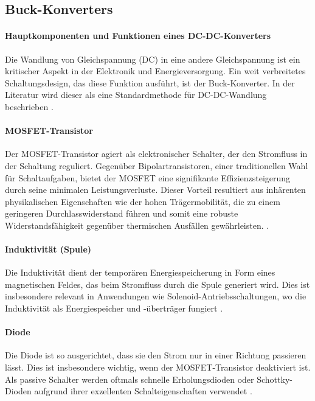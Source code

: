 \subsection{Buck-Konverters}
\label{sec:DCDC_Konverter}

\paragraph{Hauptkomponenten und Funktionen eines DC-DC-Konverters}

Die Wandlung von Gleichspannung (DC) in eine andere Gleichspannung ist ein kritischer Aspekt in der Elektronik und Energieversorgung. Ein weit verbreitetes Schaltungsdesign, das diese Funktion ausführt, ist der Buck-Konverter. In der Literatur wird dieser als eine Standardmethode für DC-DC-Wandlung beschrieben \cite{wensdesign2022}.



\paragraph{MOSFET-Transistor}
Der MOSFET-Transistor agiert als elektronischer Schalter, der den Stromfluss in der Schaltung reguliert. Gegenüber Bipolartransistoren, einer traditionellen Wahl für Schaltaufgaben, bietet der MOSFET eine signifikante Effizienzsteigerung durch seine minimalen Leistungsverluste. Dieser Vorteil resultiert aus inhärenten physikalischen Eigenschaften wie der hohen Trägermobilität, die zu einem geringeren Durchlasswiderstand führen und somit eine robuste Widerstandsfähigkeit gegenüber thermischen Ausfällen gewährleisten. \cite{choi2013pulsewidth}.

\paragraph{Induktivität (Spule)}
Die Induktivität dient der temporären Energiespeicherung in Form eines magnetischen Feldes, das beim Stromfluss durch die Spule generiert wird. Dies ist insbesondere relevant in Anwendungen wie Solenoid-Antriebsschaltungen, wo die Induktivität als Energiespeicher und -überträger fungiert \cite{choi2013pulsewidth}.

\paragraph{Diode}
Die Diode ist so ausgerichtet, dass sie den Strom nur in einer Richtung passieren lässt. Dies ist insbesondere wichtig, wenn der MOSFET-Transistor deaktiviert ist. Als passive Schalter werden oftmals schnelle Erholungsdioden oder Schottky-Dioden aufgrund ihrer exzellenten Schalteigenschaften verwendet \cite{choi2013pulsewidth}.

